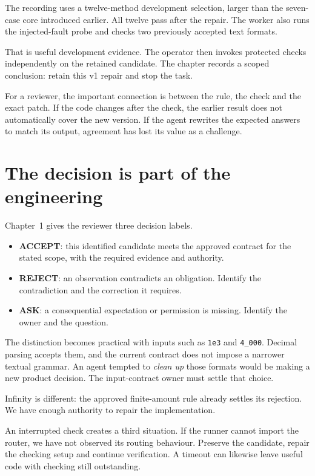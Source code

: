 \documentclass[11pt]{article}
\begin{document}
The recording uses a twelve-method development selection, larger than the seven-case core introduced earlier. All twelve pass after the repair. The worker also runs the injected-fault probe and checks two previously accepted text formats.

That is useful development evidence. The operator then invokes protected checks independently on the retained candidate. The chapter records a scoped conclusion: retain this v1 repair and stop the task.

For a reviewer, the important connection is between the rule, the check and the exact patch. If the code changes after the check, the earlier result does not automatically cover the new version. If the agent rewrites the expected answers to match its output, agreement has lost its value as a challenge.

\clearpage
\section{The decision is part of the engineering}

Chapter~1 gives the reviewer three decision labels.

\begin{itemize}
\item \textbf{ACCEPT}: this identified candidate meets the approved contract for the stated scope, with the required evidence and authority.
\item \textbf{REJECT}: an observation contradicts an obligation. Identify the contradiction and the correction it requires.
\item \textbf{ASK}: a consequential expectation or permission is missing. Identify the owner and the question.
\end{itemize}

The distinction becomes practical with inputs such as \texttt{1e3} and \texttt{4\_000}. Decimal parsing accepts them, and the current contract does not impose a narrower textual grammar. An agent tempted to \emph{clean up} those formats would be making a new product decision. The input-contract owner must settle that choice.

Infinity is different: the approved finite-amount rule already settles its rejection. We have enough authority to repair the implementation.

An interrupted check creates a third situation. If the runner cannot import the router, we have not observed its routing behaviour. Preserve the candidate, repair the checking setup and continue verification. A timeout can likewise leave useful code with checking still outstanding.
\end{document}

